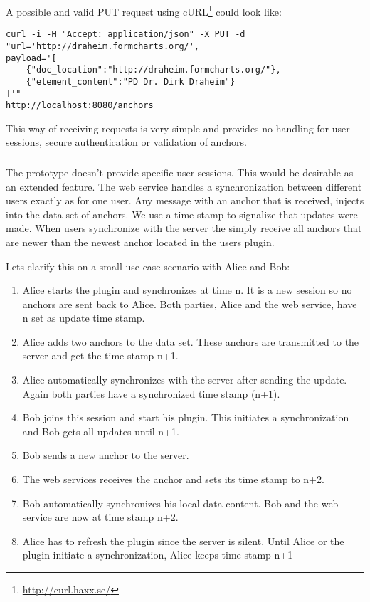 A possible and valid PUT request using cURL\footnote{\url{http://curl.haxx.se/}} could look like:

\begin{verbatim}
curl -i -H "Accept: application/json" -X PUT -d 
"url='http://draheim.formcharts.org/', 
payload='[
	{"doc_location":"http://draheim.formcharts.org/"},
	{"element_content":"PD Dr. Dirk Draheim"}
]'"  
http://localhost:8080/anchors
\end{verbatim}

This way of receiving requests is very simple and provides no handling for user sessions, secure authentication or validation of anchors.

\subsubsection[User Session Synchronization]{\reqWSii}

The prototype doesn't provide specific user sessions. This would be desirable as an extended feature. The web service handles a synchronization between different users exactly as for one user. 
Any message with an anchor that is received, injects into the data set of anchors. We use a time stamp to signalize that updates were made. When users synchronize with the server the simply receive all anchors that are newer than the newest anchor located in the users plugin. 

Lets clarify this on a small use case scenario with Alice and Bob:
\begin{enumerate}
\item Alice starts the plugin and synchronizes at time n. It is a new session so no anchors are sent back to Alice. Both parties, Alice and the web service, have n set as update time stamp.
\item Alice adds two anchors to the data set. These anchors are transmitted to the server and get the time stamp n+1.
\item Alice automatically synchronizes with the server after sending the update. Again both parties have a synchronized time stamp (n+1).
\item Bob joins this session and start his plugin. This initiates a synchronization and Bob gets all updates until n+1.
\item Bob sends a new anchor to the server. 
\item The web services receives the anchor and sets its time stamp to n+2. 
\item Bob automatically synchronizes his local data content. Bob and the web service are now at time stamp n+2. 
\item Alice has to refresh the plugin since the server is silent. Until Alice or the plugin initiate a synchronization, Alice  keeps time stamp n+1
\end{enumerate}

